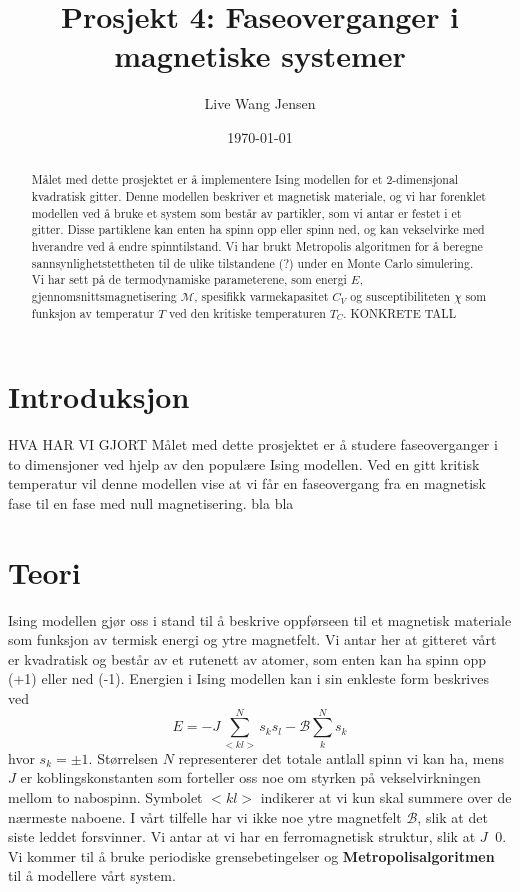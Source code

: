\documentclass[11pt,a4paper]{article}
\begin{document}
\title{Prosjekt 4: Faseoverganger i magnetiske systemer }
\author{Live Wang Jensen}
\date{\today}

\maketitle

\begin{abstract}
Målet med dette prosjektet er å implementere Ising modellen for et 2-dimensjonal kvadratisk gitter. Denne modellen beskriver et magnetisk materiale, og vi har forenklet modellen ved å bruke et system som består av partikler, som vi antar er festet i et gitter. Disse partiklene kan enten ha spinn opp eller spinn ned, og kan vekselvirke med hverandre ved å endre spinntilstand. Vi har brukt Metropolis algoritmen for å beregne sannsynlighetstettheten til de ulike tilstandene (?) under en Monte Carlo simulering. Vi har sett på de termodynamiske parameterene, som energi $E$, gjennomsnittsmagnetisering $\mathcal{M}$, spesifikk varmekapasitet $C_V$ og susceptibiliteten $\chi$ som funksjon av temperatur $T$ ved den kritiske temperaturen $T_C$. KONKRETE TALL

\end{abstract}

\tableofcontents

\clearpage
\section{Introduksjon}
HVA HAR VI GJORT
Målet med dette prosjektet er å studere faseoverganger i to dimensjoner ved hjelp av den populære Ising modellen. Ved en gitt kritisk temperatur vil denne modellen vise at vi får en faseovergang fra en magnetisk fase til en fase med null magnetisering.
bla bla



\section{Teori}
Ising modellen gjør oss i stand til å beskrive oppførseen til et magnetisk materiale som funksjon av termisk energi og ytre magnetfelt. Vi antar her at gitteret vårt er kvadratisk og består av et rutenett av atomer, som enten kan ha spinn opp (+1) eller ned (-1). Energien i Ising modellen kan i sin enkleste form beskrives ved 
\begin{equation}
E = -J\sum_{<kl>}^N s_ks_l - \mathcal{ B} \sum_k^N s_k
\end{equation}
hvor $s_k = \pm 1$. Størrelsen $N$ representerer det totale antlall spinn vi kan ha, mens $J$ er koblingskonstanten som forteller oss noe om styrken på vekselvirkningen mellom to nabospinn. Symbolet $<kl>$ indikerer at vi kun skal summere over de nærmeste naboene. I vårt tilfelle har vi ikke noe ytre magnetfelt $\mathcal{B}$, slik at det siste leddet forsvinner. Vi antar at vi har en ferromagnetisk struktur, slik at $J \>$ 0. Vi kommer til å bruke periodiske grensebetingelser og \textbf{Metropolisalgoritmen} til å modellere vårt system. \\
\end{document}
